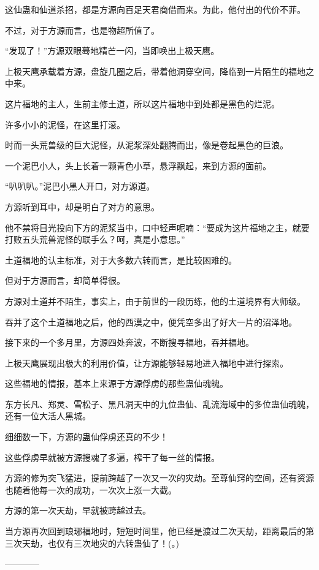\begin{this_body}
这仙蛊和仙道杀招，都是方源向百足天君商借而来。为此，他付出的代价不菲。

不过，对于方源而言，也是物超所值了。

“发现了！”方源双眼蓦地精芒一闪，当即唤出上极天鹰。

上极天鹰承载着方源，盘旋几圈之后，带着他洞穿空间，降临到一片陌生的福地之中来。

这片福地的主人，生前主修土道，所以这片福地中到处都是黑色的烂泥。

许多小小的泥怪，在这里打滚。

时而一头荒兽级的巨大泥怪，从泥浆深处翻腾而出，像是卷起黑色的巨浪。

一个泥巴小人，头上长着一颗青色小草，悬浮飘起，来到方源的面前。

“叭叭叭。”泥巴小黑人开口，对方源道。

方源听到耳中，却是明白了对方的意思。

他不禁将目光投向下方的泥浆当中，口中轻声呢喃：“要成为这片福地之主，就要打败五头荒兽泥怪的联手么？呵，真是小意思。”

土道福地的认主标准，对于大多数六转而言，是比较困难的。

但对于方源而言，却简单得很。

方源对土道并不陌生，事实上，由于前世的一段历练，他的土道境界有大师级。

吞并了这个土道福地之后，他的西漠之中，便凭空多出了好大一片的沼泽地。

接下来的一个多月里，方源四处奔波，不断搜寻福地，吞并福地。

上极天鹰展现出极大的利用价值，让方源能够轻易地进入福地中进行探索。

这些福地的情报，基本上来源于方源俘虏的那些蛊仙魂魄。

东方长凡、郑灵、雪松子、黑凡洞天中的九位蛊仙、乱流海域中的多位蛊仙魂魄，还有一位大活人黑城。

细细数一下，方源的蛊仙俘虏还真的不少！

这些俘虏早就被方源搜魂了多遍，榨干了每一丝的情报。

方源的修为突飞猛进，提前跨越了一次又一次的灾劫。至尊仙窍的空间，还有资源也随着他每一次的成功，一次次上涨一大截。

方源的第一次天劫，早就被跨越过去。

当方源再次回到琅琊福地时，短短时间里，他已经是渡过二次天劫，距离最后的第三次天劫，也仅有三次地灾的六转蛊仙了！(。)

------------


\end{this_body}

